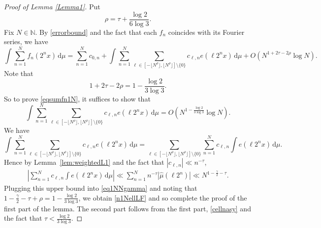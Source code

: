\documentclass[amssymb,amsfonts,refcheck,12pt,verbatim,righttag]{amsart}
\numberwithin{equation}{section} %
\theoremstyle{plain}
\begin{document}
\begin{proof}[Proof of Lemma \ref{Lemma1}] 
Put
	\begin{equation*}
\rho=\tau+\frac{\log2}{6\log3}.
	\end{equation*}
	Fix $N\in\mathbb{N}$. By \eqref{errorbound} and the fact that each $f_n$ coincides with its Fourier series, we have  $$\int \sum_{n=1}^{N}f_{n}(2^nx)\, \mathrm{d}\mu = \sum_{n=1}^{N}c_{0,n}+\int \sum_{n=1}^{N}\sum_{\ell\in [-\lfloor N^{ \rho}\rfloor ,\lfloor N^{\rho}\rfloor]\setminus \{0\}}c_{\ell,n}e(\ell 2^nx)\, \mathrm{d}\mu+O\left(N^{1+2\tau-2\rho}\log N\right).$$
	Note that 
	\[1+2\tau-2\rho=1-\frac{\log2}{3\log3}.\]
	So to prove \eqref{eqsumfn1N}, it suffices to show that
	\begin{equation}
		\label{n1NellLF}
		\int \sum_{n=1}^{N}\sum_{\ell\in [-\lfloor N^{\rho}\rfloor ,\lfloor N^{\rho}\rfloor]\setminus \{0\}}c_{\ell,n}e(\ell2^nx)\, \mathrm{d}\mu=O\left(N^{1-\frac{\log2}{3\log3}}\log N\right).
	\end{equation}
	We have 
	\begin{equation}\label{eq1NNgamma}
		\int \sum_{n=1}^{N}\sum_{\ell\in [-\lfloor N^{\rho}\rfloor,\lfloor N^{\rho }\rfloor]\setminus \{0\}}c_{\ell,n}e(\ell 2^nx)\, \mathrm{d}\mu=\sum_{\ell\in [-\lfloor N^{ \rho}\rfloor,\lfloor N^{ \rho}\rfloor]\setminus \{0\}}\sum_{n=1}^{N}c_{\ell,n}\int e(\ell 2^nx)\, \mathrm{d}\mu.
	\end{equation} 
     Hence by Lemma~\ref{lem:weightedL1} and the fact that $|c_{\ell,n}|\ll n^{-\tau}$, 
	\begin{align*}
		\left|\sum_{n=1}^{N}c_{\ell,n}\int e(\ell 2^nx)\, \mathrm{d}\mu\right|\ll \sum_{n=1}^{N }n^{-\tau}|\widehat{\mu}(\ell 2^n)|
		\ll N^{1-\frac{\gamma}{2}-\tau}.
	\end{align*}
Plugging this upper bound into \eqref{eq1NNgamma} and noting that $1-\frac{\gamma}{2}-\tau+\rho=1-\frac{\log2}{3\log3}$, we obtain  \eqref{n1NellLF} and so complete the proof of the first part of the lemma. The second part follows from the first part, \eqref{cellnasy} and the fact that $\tau <\frac{\log2}{3\log3}$.  
\end{proof}


 
\end{document}
